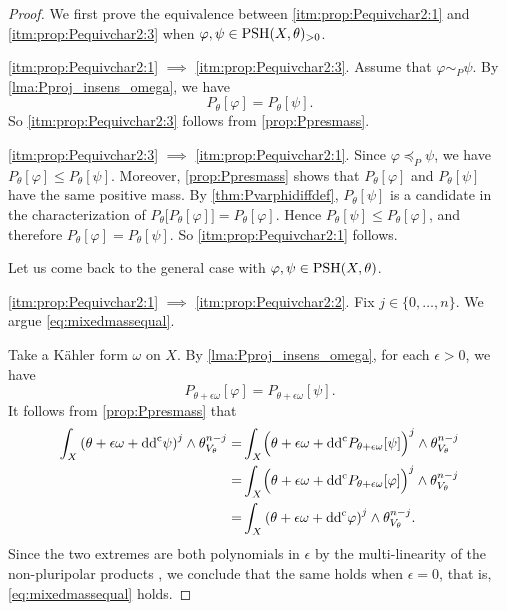 \begin{proof}
    We first prove the equivalence between \ref{itm:prop:Pequivchar2:1} and \ref{itm:prop:Pequivchar2:3} when $\varphi,\psi\in \mathrm{PSH}(X,\theta)_{>0}$.

    \ref{itm:prop:Pequivchar2:1} $\implies$ \ref{itm:prop:Pequivchar2:3}. Assume that $\varphi\sim_P \psi$. By \cref{lma:Pproj_insens_omega}, we have
    \[
        P_{\theta}[\varphi]=P_{\theta}[\psi].
    \]
    So \ref{itm:prop:Pequivchar2:3} follows from \cref{prop:Ppresmass}.

    \ref{itm:prop:Pequivchar2:3} $\implies$ \ref{itm:prop:Pequivchar2:1}. Since $\varphi\preceq_P\psi$, we have $P_{\theta}[\varphi]\leq P_{\theta}[\psi]$.
    Moreover, \cref{prop:Ppresmass} shows that $P_{\theta}[\varphi]$ and $P_{\theta}[\psi]$ have the same positive mass.
    By \cref{thm:Pvarphidiffdef}, $P_{\theta}[\psi]$ is a candidate in the characterization of $P_{\theta}\bigl[P_{\theta}[\varphi]\bigr]=P_{\theta}[\varphi]$.
    Hence $P_{\theta}[\psi]\leq P_{\theta}[\varphi]$, and therefore $P_{\theta}[\varphi]=P_{\theta}[\psi]$.
    So \ref{itm:prop:Pequivchar2:1} follows.

    Let us come back to the general case with $\varphi,\psi\in \mathrm{PSH}(X,\theta)$.

    \ref{itm:prop:Pequivchar2:1} $\implies$ \ref{itm:prop:Pequivchar2:2}.
    Fix $j\in \{0,\ldots,n\}$. We argue \eqref{eq:mixedmassequal}.

    Take a Kähler form $\omega$ on $X$. By \cref{lma:Pproj_insens_omega}, for each $\epsilon>0$, we have
    \[
        P_{\theta+\epsilon\omega}[\varphi]=  P_{\theta+\epsilon\omega}[\psi].
    \]
    It follows from \cref{prop:Ppresmass} that
    \[
        \begin{aligned}
        \int_X \left(\theta+\epsilon\omega+\mathrm{dd}^{\mathrm{c}} \psi  \right)^j\wedge \theta_{V_{\theta}}^{n-j}=&\int_X \Bigl(\theta+\epsilon\omega+\mathrm{dd}^{\mathrm{c}} P_{\theta+\epsilon\omega}[\psi]  \Bigr)^j\wedge \theta_{V_{\theta}}^{n-j}\\
        =&\int_X \Bigl(\theta+\epsilon\omega+\mathrm{dd}^{\mathrm{c}} P_{\theta+\epsilon\omega}[\varphi]  \Bigr)^j\wedge \theta_{V_{\theta}}^{n-j} \\
        =& \int_X \left(\theta+\epsilon\omega+\mathrm{dd}^{\mathrm{c}} \varphi  \right)^j\wedge \theta_{V_{\theta}}^{n-j}.
        \end{aligned}
    \]
    Since the two extremes are both polynomials in $\epsilon$ by the multi-linearity of the non-pluripolar products , we conclude that the same holds when $\epsilon=0$, that is, \eqref{eq:mixedmassequal} holds.


\end{proof}

